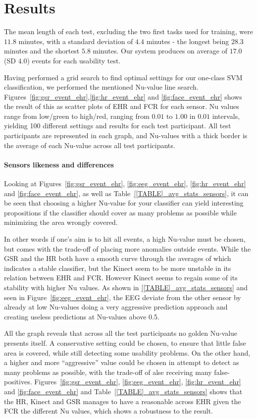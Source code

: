 \section{Results}
The mean length of each test, excluding the two first tasks used for training, were $11.8$ minutes, with a standard
deviation of $4.4$ minutes - the longest being $28.3$ minutes and the shortest $5.8$ minutes.
Our system produces on average of $17.0$ (SD $4.0$) events for each usability test.



Having performed a grid search to find optimal settings for our one-class SVM classification, we performed the mentioned
Nu-value line search. Figures~\ref{fig:gsr_event_ehr},\ref{fig:hr_event_ehr} and \ref{fig:face_event_ehr}
shows the result of this as scatter plots of EHR and FCR for each sensor. Nu values range from low/green to high/red,
ranging from $0.01$ to $1.00$ in $0.01$ intervals, yielding 100 different settings and results for each test
participant. All test participants are represented in each graph, and Nu-values with a thick border is the average of
each Nu-value across all test participants.

\paragraph{Sensors likeness and differences}
Looking at Figures~\ref{fig:gsr_event_ehr}, \ref{fig:eeg_event_ehr}, \ref{fig:hr_event_ehr} and \ref{fig:face_event_ehr},
as well as Table~\ref{[TABLE]_avg_stats_sensors}, it can be seen that choosing a higher Nu-value for your classifier can yield interesting propositions if the classifier should cover as many problems as possible while minimizing the area wrongly covered.

In other words if one's aim is to hit all events, a high Nu-value must be chosen, but comes with the trade-off of placing more anomalies outside events. 
While the GSR and the HR both have a smooth curve through the averages of which indicates a stable classifier, but the Kinect seem to be more unstable in its relation between EHR and FCR. However Kinect seems to regain some of its stability with higher Nu values. As shown in \ref{[TABLE]_avg_stats_sensors} and seen in Figure~\ref{fig:eeg_event_ehr}, the EEG deviate from the other sensor by already at low Nu-values doing a very aggressive prediction approach and creating useless predictions at Nu-values above 0.5.

All the graph reveals that across all the test participants no golden Nu-value presents itself. A conservative
setting could be chosen, to ensure that little false area is covered, while still detecting some usability problems. On
the other hand, a higher and more ``aggressive'' value could be chosen in attempt to detect as many problems as
possible, with the trade-off of alse receiving many false-positives. Figures~\ref{fig:gsr_event_ehr},
\ref{fig:eeg_event_ehr}, \ref{fig:hr_event_ehr} and \ref{fig:face_event_ehr} and Table~\ref{[TABLE]_avg_stats_sensors}
shows that the HR, Kinect and GSR manages to have a reasonable across EHR given the FCR the different Nu values, which shows a robustness to the result.

